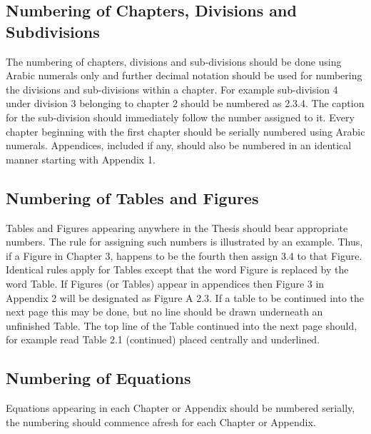 \subsection{Numbering of Chapters, Divisions and Subdivisions}
The numbering of chapters, divisions and sub-divisions should be done using Arabic numerals only and further decimal notation should be used for numbering the divisions and sub-divisions within a chapter. For example sub-division 4 under division 3 belonging to chapter 2 should be numbered as 2.3.4. The caption for the sub-division should immediately follow the number assigned to it.
Every chapter beginning with the first chapter should be serially numbered using Arabic numerals. Appendices, included if any, should also be numbered in an identical manner starting with Appendix 1.

\subsection{Numbering of Tables and Figures}
Tables and Figures appearing anywhere in the Thesis should bear appropriate numbers. The rule for assigning such numbers is illustrated by an example. Thus, if a Figure in Chapter 3, happens to be the fourth then assign 3.4 to that Figure. Identical rules apply for Tables except that the word Figure is replaced by the word Table. If Figures (or Tables) appear in appendices then Figure 3 in Appendix 2 will be designated as Figure A 2.3. If a table to be continued into the next page this may be done, but no line should be drawn underneath an unfinished Table. The top line of the Table continued into the next page should, for example read Table 2.1
(continued) placed centrally and underlined.

\subsection{Numbering of Equations}
Equations appearing in each Chapter or Appendix should be numbered serially, the numbering should commence afresh for each Chapter or Appendix.


